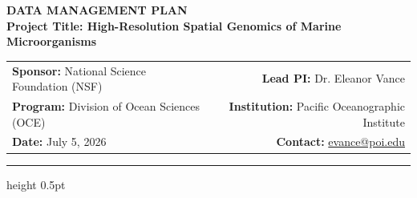 \documentclass[10pt,letterpaper]{article}
\begin{document}
\color{neutraldark}

\begin{center}
    {\color{accent}\Large\bfseries DATA MANAGEMENT PLAN} \\[0.5em]
    {\large\bfseries Project Title: High-Resolution Spatial Genomics of Marine Microorganisms} \\[0.3em]
    \vspace{0.2em}
    \begin{tabularx}{\linewidth}{X r}
        \textbf{Sponsor:} National Science Foundation (NSF) & \textbf{Lead PI:} Dr. Eleanor Vance \\
        \textbf{Program:} Division of Ocean Sciences (OCE) & \textbf{Institution:} Pacific Oceanographic Institute \\
        \textbf{Date:} July 5, 2026 & \textbf{Contact:} \href{mailto:evance@poi.edu}{evance@poi.edu}
    \end{tabularx}
\end{center}
\vspace{0.4em}
\hrule height 0.5pt
\vspace{0.8em}







\end{document}
